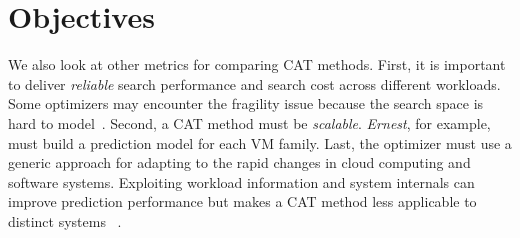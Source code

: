 \section{Objectives}



We also look at other metrics for comparing CAT methods.
First, it is important to deliver \emph{reliable}
search performance and search cost across different workloads.
Some optimizers may encounter the fragility issue because
the search space is hard to model~\cite{Hsu2018Arrow}.
Second, a CAT method must be \emph{scalable}.
\emph{Ernest}, for example, must build a prediction model
for each VM family. 
Last, the optimizer must use a generic approach for adapting to
the rapid changes in cloud computing and software systems.
Exploiting workload information and system internals
can improve prediction performance but
makes a CAT method less applicable to distinct systems
~\cite{Wang2004,Venkataraman2016}.



